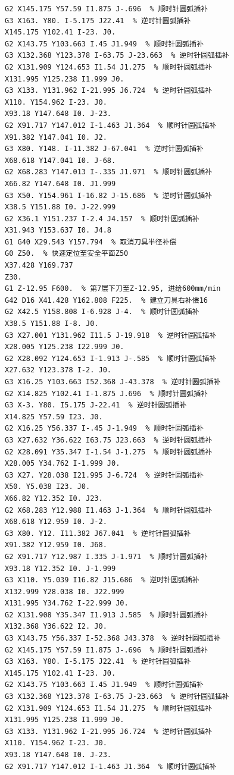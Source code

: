 \documentclass{xautCADreport}
\begin{document}
\begin{lstlisting}[language={}, title={工序50-凸模.nc（完整程序）}, basicstyle=\ttfamily\tiny]
G2 X145.175 Y57.59 I1.875 J-.696  % 顺时针圆弧插补
G3 X163. Y80. I-5.175 J22.41  % 逆时针圆弧插补
X145.175 Y102.41 I-23. J0.
G2 X143.75 Y103.663 I.45 J1.949  % 顺时针圆弧插补
G3 X132.368 Y123.378 I-63.75 J-23.663  % 逆时针圆弧插补
G2 X131.909 Y124.653 I1.54 J1.275  % 顺时针圆弧插补
X131.995 Y125.238 I1.999 J0.
G3 X133. Y131.962 I-21.995 J6.724  % 逆时针圆弧插补
X110. Y154.962 I-23. J0.
X93.18 Y147.648 I0. J-23.
G2 X91.717 Y147.012 I-1.463 J1.364  % 顺时针圆弧插补
X91.382 Y147.041 I0. J2.
G3 X80. Y148. I-11.382 J-67.041  % 逆时针圆弧插补
X68.618 Y147.041 I0. J-68.
G2 X68.283 Y147.013 I-.335 J1.971  % 顺时针圆弧插补
X66.82 Y147.648 I0. J1.999
G3 X50. Y154.961 I-16.82 J-15.686  % 逆时针圆弧插补
X38.5 Y151.88 I0. J-22.999
G2 X36.1 Y151.237 I-2.4 J4.157  % 顺时针圆弧插补
X31.943 Y153.637 I0. J4.8
G1 G40 X29.543 Y157.794  % 取消刀具半径补偿
G0 Z50.  % 快速定位至安全平面Z50
X37.428 Y169.737
Z30.
G1 Z-12.95 F600.  % 第7层下刀至Z-12.95, 进给600mm/min
G42 D16 X41.428 Y162.808 F225.  % 建立刀具右补偿16
G2 X42.5 Y158.808 I-6.928 J-4.  % 顺时针圆弧插补
X38.5 Y151.88 I-8. J0.
G3 X27.001 Y131.962 I11.5 J-19.918  % 逆时针圆弧插补
X28.005 Y125.238 I22.999 J0.
G2 X28.092 Y124.653 I-1.913 J-.585  % 顺时针圆弧插补
X27.632 Y123.378 I-2. J0.
G3 X16.25 Y103.663 I52.368 J-43.378  % 逆时针圆弧插补
G2 X14.825 Y102.41 I-1.875 J.696  % 顺时针圆弧插补
G3 X-3. Y80. I5.175 J-22.41  % 逆时针圆弧插补
X14.825 Y57.59 I23. J0.
G2 X16.25 Y56.337 I-.45 J-1.949  % 顺时针圆弧插补
G3 X27.632 Y36.622 I63.75 J23.663  % 逆时针圆弧插补
G2 X28.091 Y35.347 I-1.54 J-1.275  % 顺时针圆弧插补
X28.005 Y34.762 I-1.999 J0.
G3 X27. Y28.038 I21.995 J-6.724  % 逆时针圆弧插补
X50. Y5.038 I23. J0.
X66.82 Y12.352 I0. J23.
G2 X68.283 Y12.988 I1.463 J-1.364  % 顺时针圆弧插补
X68.618 Y12.959 I0. J-2.
G3 X80. Y12. I11.382 J67.041  % 逆时针圆弧插补
X91.382 Y12.959 I0. J68.
G2 X91.717 Y12.987 I.335 J-1.971  % 顺时针圆弧插补
X93.18 Y12.352 I0. J-1.999
G3 X110. Y5.039 I16.82 J15.686  % 逆时针圆弧插补
X132.999 Y28.038 I0. J22.999
X131.995 Y34.762 I-22.999 J0.
G2 X131.908 Y35.347 I1.913 J.585  % 顺时针圆弧插补
X132.368 Y36.622 I2. J0.
G3 X143.75 Y56.337 I-52.368 J43.378  % 逆时针圆弧插补
G2 X145.175 Y57.59 I1.875 J-.696  % 顺时针圆弧插补
G3 X163. Y80. I-5.175 J22.41  % 逆时针圆弧插补
X145.175 Y102.41 I-23. J0.
G2 X143.75 Y103.663 I.45 J1.949  % 顺时针圆弧插补
G3 X132.368 Y123.378 I-63.75 J-23.663  % 逆时针圆弧插补
G2 X131.909 Y124.653 I1.54 J1.275  % 顺时针圆弧插补
X131.995 Y125.238 I1.999 J0.
G3 X133. Y131.962 I-21.995 J6.724  % 逆时针圆弧插补
X110. Y154.962 I-23. J0.
X93.18 Y147.648 I0. J-23.
G2 X91.717 Y147.012 I-1.463 J1.364  % 顺时针圆弧插补

\end{lstlisting}
\end{document}
